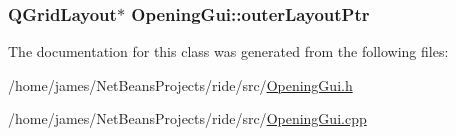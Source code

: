 \hypertarget{class_opening_gui_a7d10dccf3f6292a7b28dc59341458200}{
\subsubsection[{outer\-Layout\-Ptr}]{\setlength{\rightskip}{0pt plus 5cm}Q\-Grid\-Layout$\ast$ Opening\-Gui\-::outer\-Layout\-Ptr\hspace{0.3cm}{\ttfamily [private]}}}\label{class_opening_gui_a7d10dccf3f6292a7b28dc59341458200}


The documentation for this class was generated from the following files\-:\begin{DoxyCompactItemize}
\item 
/home/james/\-Net\-Beans\-Projects/ride/src/\hyperlink{_opening_gui_8h}{Opening\-Gui.\-h}\item 
/home/james/\-Net\-Beans\-Projects/ride/src/\hyperlink{_opening_gui_8cpp}{Opening\-Gui.\-cpp}\end{DoxyCompactItemize}
